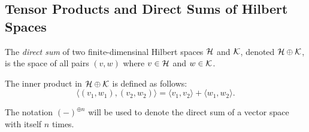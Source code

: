 \subsection {Tensor Products and Direct Sums of Hilbert Spaces}

\begin{definition}
  The \emph{direct sum} of two finite-dimensinal Hilbert spaces $\mathcal{H}$ and $\mathcal{K}$, denoted $\mathcal{H} \oplus \mathcal{K}$, is the space of all pairs $(v, w)$ where $v \in \mathcal{H}$ and $w \in \mathcal{K}$.
\end{definition}

The inner product in $\mathcal{H} \oplus \mathcal{K}$ is defined as follows:
\begin{equation*}
  \langle (v_1, w_1), (v_2, w_2) \rangle = \langle v_1, v_2 \rangle + \langle w_1, w_2 \rangle.
\end{equation*}

The notation $(-)^{\oplus n}$ will be used to denote the direct sum of a vector space with itself $n$ times.



